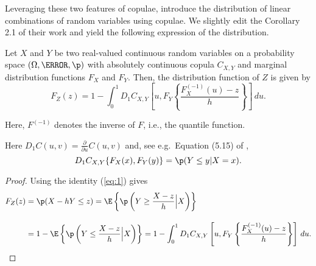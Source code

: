 Leveraging these two features of copulae, \citet{barbi2014copula}
introduce the distribution of linear combinations of random variables
using copulae. 
We slightly edit the Corollary 2.1 of their work and yield the
following expression of the distribution. 

\begin{proposition}
  \label{prop:dfrh}
  Let $X$ and $Y$ be two real-valued continuous random
  variables on a
  probability space $(\Omega, \F, \p)$ with
  absolutely continuous copula $C_{X, Y}$ and marginal distribution functions $F_{X}$
  and $F_{Y}$. Then, the distribution function of $Z$ is given by 
  \begin{equation}
    \label{eq:3}
    F_{Z}(z) = 1- \int^1_0 D_1 C_{X, Y}
    \left[ u, F_{Y} \left\{ \frac{F^{(-1)}_{X}(u)-z}{h} \right\}
    \right]\, d u.
  \end{equation}
\end{proposition}
Here, $F^{(-1)}$ denotes the inverse of $F$, i.e., the quantile
function. \medskip

Here $D_1 C(u,v)=\displaystyle \frac{\partial}{\partial u} C(u,v)$ and, see e.g.\ Equation (5.15) of
\citep{McNeil2005},
\begin{equation}
  \label{eq:1}
  D_1 C_{X,Y}\{F_X(x), F_Y(y)\} = \p(Y\leq y|X=x).
\end{equation}
\begin{proof}
  Using the identity (\ref{eq:1}) gives
  \begin{align*}
    F_{Z}(z) &= \p(X - h Y\leq z) %
                 = \E\left\{\p\left(Y\geq \frac{X-z}{h}\Big|
                 X\right)\right\}\\[10pt]
               &= 1-\E\left\{\p\left(Y\leq \frac{X-z}{h}\Big|
                 X\right)\right\}%
               = 1- \int_0^1 D_1 C_{X, Y}\left[u,
                 F_{Y}\left\{\frac{F^{(-1)}_{X}(u) -
                 z}{h}\right\}\right]\, d u.
  \end{align*}
  \end{proof}


